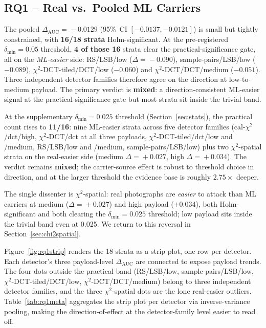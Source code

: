 \documentclass[10pt,twocolumn,a4paper]{article}
\begin{document}
\subsection{RQ1 -- Real vs.\ Pooled ML Carriers}
\label{sec:rq1}

The pooled $\Delta_\text{AUC}\!=\!-0.0129$ (95\%~CI $[-0.0137,-0.0121]$) is small but tightly constrained, with \textbf{16/18 strata} Holm-significant. At the pre-registered $\delta_\text{min}\!=\!0.05$ threshold, \textbf{4 of those 16} strata clear the practical-significance gate, all on the \emph{ML-easier} side: RS/LSB/low ($\Delta\!=\!-0.090$), sample-pairs/LSB/low ($-0.089$), $\chi^2$-DCT-tiled/DCT/low ($-0.060$) and $\chi^2$-DCT/DCT/medium ($-0.051$). Three independent detector families therefore agree on the direction at low-to-medium payload. The primary verdict is \textbf{mixed}: a direction-consistent ML-easier signal at the practical-significance gate but most strata sit inside the trivial band.

At the supplementary $\delta_\text{min}\!=\!0.025$ threshold (Section~\ref{sec:stats}), the practical count rises to \textbf{11/16}: nine ML-easier strata across five detector families (cal-$\chi^2$/dct/high, $\chi^2$-DCT/dct at all three payloads, $\chi^2$-DCT-tiled/dct/low and /medium, RS/LSB/low and /medium, sample-pairs/LSB/low) plus two $\chi^2$-spatial strata on the real-easier side (medium $\Delta\!=\!+0.027$, high $\Delta\!=\!+0.034$). The verdict remains \textbf{mixed}; the carrier-source effect is robust to threshold choice in direction, and at the larger threshold the evidence base is roughly $2.75\!\times\!$ deeper.

The single dissenter is $\chi^2$-spatial: real photographs are \emph{easier} to attack than ML carriers at medium ($\Delta\!=\!+0.027$) and high payload ($+0.034$), both Holm-significant and both clearing the $\delta_\text{min}\!=\!0.025$ threshold; low payload sits inside the trivial band even at 0.025. We return to this reversal in Section~\ref{sec:chi2spatial}.

Figure~\ref{fig:rq1strip} renders the 18 strata as a strip plot, one row per detector. Each detector's three payload-level $\Delta_\text{AUC}$ are connected to expose payload trends. The four dots outside the practical band (RS/LSB/low, sample-pairs/LSB/low, $\chi^2$-DCT-tiled/DCT/low, $\chi^2$-DCT/DCT/medium) belong to three independent detector families, and the three $\chi^2$-spatial dots are the lone real-easier outliers. Table~\ref{tab:rq1meta} aggregates the strip plot per detector via inverse-variance pooling, making the direction-of-effect at the detector-family level easier to read off.
\end{document}
